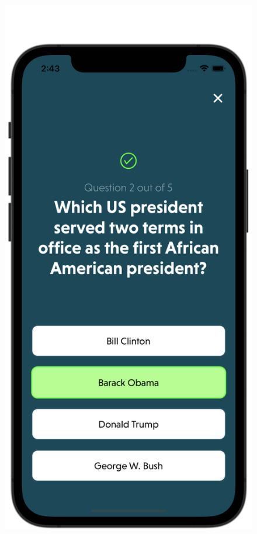 \begin{figure}[H]
    \centering
    \begin{minipage}[b]{0.43\linewidth}
        \centering
        \includegraphics[width=\linewidth]{Mobile UI/Reviewing correct solution.png}

\end{minipage}
\end{figure}
